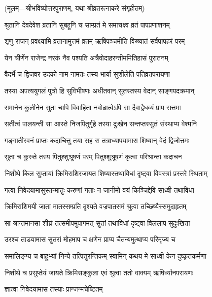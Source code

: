 \centerline{\small{(मूलम्—श्रीभविष्योत्तरपुराणम्, यथा श्रीव्रतरत्नाकरे संगृहीतम्)}}

\twolineshloka
{श्रुतानि देवदेवेश व्रतानि सुबहूनि च}
{साम्प्रतं मे समाचक्ष्व व्रतं पापप्रणाशनम्} %


\twolineshloka
{शृणु राजन् प्रवक्ष्यामि व्रतानामुत्तमं व्रतम्}
{ऋषिपञ्चमीति विख्यातं सर्वपापहरं परम्} %

\twolineshloka
{येन चीर्णेन राजेन्द्र नरकं नैव पश्यति}
{अत्रैवोदाहरन्तीममितिहासं पुरातनम्} %

\twolineshloka
{वैदर्भे च द्विजवर उदको नाम नामतः}
{तस्य भार्या सुशीलेति पतिव्रतपरायणा} %

\twolineshloka
{तस्या अपत्ययुगलं पुत्रो हि सुविभीषणः}
{अधीतवान् सुतस्तस्य वेदान् साङ्गपदक्रमान्} %

\twolineshloka
{समानेन कुलीनेन सुता चापि विवाहिता}
{नवोढात्वेऽपि सा दैवाद्वैधव्यं प्राप सत्तमा} %

\twolineshloka
{सतीत्वं पालयन्ती सा आस्ते निजपितुर्गृहे}
{तस्या दुःखेन सन्तप्तस्सुतं संस्थाप्य वेश्मनि} %

\twolineshloka
{गङ्गातीरवनं प्राप्तः कदाचित्तु तया सह}
{स तत्राध्यापयामास शिष्यान् वेदं द्विजोत्तमः} %

\twolineshloka
{सुता च कुरुते तस्य पितुश्शुश्रूषणं परम्}
{पितुश्शुश्रूषणं कृत्वा परिश्रान्ता कदाचन} %

\twolineshloka
{निशीथे किल सुप्तायां क्रिमिराशिरजायत}
{शिष्यास्तथाविधां दृष्ट्वा विवस्त्रां प्रस्तरे स्थिताम्} %

\twolineshloka
{गत्वा निवेदयामासुस्तन्मातुः करुणां गताः}
{न जानीमो वयं किञ्चिद्देवि साध्वी तथाविधा} %

\twolineshloka
{क्रिमिराशिमयी जाता मातस्सम्प्रति दृश्यते}
{वज्रपातसमं श्रुत्वा तच्छिष्यैस्समुदाहृतम्} %

\twolineshloka
{सा श्रान्तमानसा शीघ्रं तत्समीपमुपागमत्}
{सुतां तथाविधां दृष्ट्वा विललाप सुदुःखिता} %

\twolineshloka
{उरश्च ताडयामास सुतरां मोहमाप च}
{क्षणेन प्राप्य चैतन्यमुत्थाप्य परिमृज्य च} %

\twolineshloka
{समालिङ्ग्य च बाहुभ्यां निन्ये तत्पितुरन्तिकम्}
{स्वामिन् कथय मे साध्वी केन दुष्कृतकर्मणा} %

\twolineshloka
{निशीथे च प्रसुप्तेयं जायते क्रिमिसङ्कुला}
{एवं श्रुत्वा ततो वाक्यम् ऋषिर्ध्यानपरायणः} %

\onelineshloka
{ज्ञात्वा निवेदयामास तस्याः प्राग्जन्मचेष्टितम्} %


